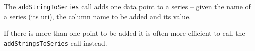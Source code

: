 The \verb+addStringToSeries+ call adds one data point to a series -- given the name of a series (its uri),
the column name to be added and its value.

If there is more than one point to be added it is often more efficient to call the \verb+addStringsToSeries+ call
instead.
